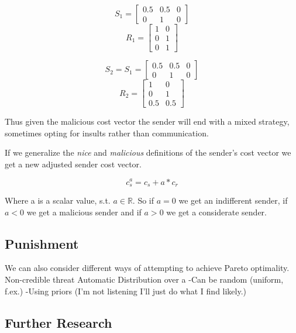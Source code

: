 \documentclass{article}
\begin{document}
\begin{equation*}
S_1=
\begin{bmatrix}
0.5 & 0.5 & 0\\
0 & 1 & 0
\end{bmatrix}
\end{equation*}
\begin{equation*}
R_1=
\begin{bmatrix}
1 & 0\\
0 & 1\\
0 & 1
\end{bmatrix}
\end{equation*}

\begin{equation*}
S_2=S_1=
\begin{bmatrix}
0.5 & 0.5 & 0\\
0 & 1 & 0
\end{bmatrix}
\end{equation*}
\begin{equation*}
R_2=
\begin{bmatrix}
1 & 0\\
0 & 1\\
0.5 & 0.5
\end{bmatrix}
\end{equation*}

Thus given the malicious cost vector the sender will end with a mixed strategy, sometimes opting for insults rather than communication.

If we generalize the \textit{nice} and \textit{malicious} definitions of the sender's cost vector we get a new adjusted sender cost vector.

\begin{equation*}
c_s^a= c_s + a * c_r
\end{equation*}

Where a is a scalar value, s.t. $a \in \mathbb{R} $. So if $a=0$ we get an indifferent sender, if$a <0$ we get a malicious sender and if $a>0$ we get a considerate sender.

\subsection{Punishment}
We can also consider different ways of attempting to achieve Pareto optimality.
Non-credible threat
Automatic
Distribution over a
-Can be random (uniform, f.ex.)
-Using priors (I'm not listening I'll just do what I find likely.)

\subsection{Further Research}
\end{document}
